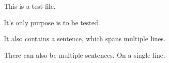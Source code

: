 \documentclass{article}
\begin{document}
This is a test file.

It's only purpose is to be tested.

It also contains a sentence,
which spans multiple lines.

There can also be multiple sentences. On a single line.
\end{document}
